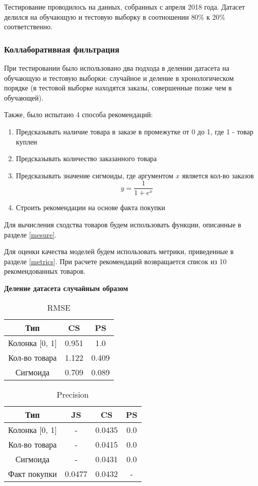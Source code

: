 Тестирование проводилось на данных, собранных с апреля 2018 года. Датасет делился
на обучающую и тестовую выборку в соотношении 80\% к 20\% соответственно.

\subsubsection{Коллаборативная фильтрация}

При тестировании было использовано два подхода в делении датасета на обучающую
и тестовую выборки: случайное и деление в хронологическом порядке (в тестовой
выборке находятся заказы, совершенные позже чем в обучающей).

Также, было испытано 4 способа рекомендаций:
\begin{enumerate}
  \item Предсказывать наличие товара в заказе в промежутке от 0 до 1, где 1 - товар куплен
  \item Предсказывать количество заказанного товара
  \item Предсказывать значение сигмоиды, где аргументом $x$ является кол-во заказов
  \begin{equation}
    y = \frac{1}{1 + e^x}
  \end{equation}
  \item Строить рекомендации на основе факта покупки
\end{enumerate}
Для вычисления сходства товаров будем использовать функции, описанные в разделе \ref{mesure}.

Для оценки качества моделей будем использовать метрики, приведенные в разделе \ref{metrics}.
При расчете рекомендаций возвращается список из 10 рекомендованных товаров.


\textbf{Деление датасета случайным образом}

\begin{table}[H]
  \centering
  \begin{tabular} { | c | c | c | }
    \hline
    Тип & CS & PS \\
    \hline
    Колонка [0, 1] & 0.951 & 1.0 \\
    \hline
    Кол-во товара & 1.122 & 0.409 \\
    \hline
    Сигмоида & 0.709 & 0.089 \\
    \hline
  \end{tabular}
  \caption{RMSE}
\end{table}

\begin{table}[H]
  \centering
  \begin{tabular} { | c | c | c | c | }
    \hline
    Тип & JS & CS & PS \\
    \hline
    Колонка [0, 1] & - & 0.0435 & 0.0 \\
    \hline
    Кол-во товара & - & 0.0415 & 0.0 \\
    \hline
    Сигмоида & - & 0.0431 & 0.0 \\
    \hline
    Факт покупки & 0.0477 & 0.0432 & - \\
    \hline
  \end{tabular}
  \caption{Precision}
\end{table}

